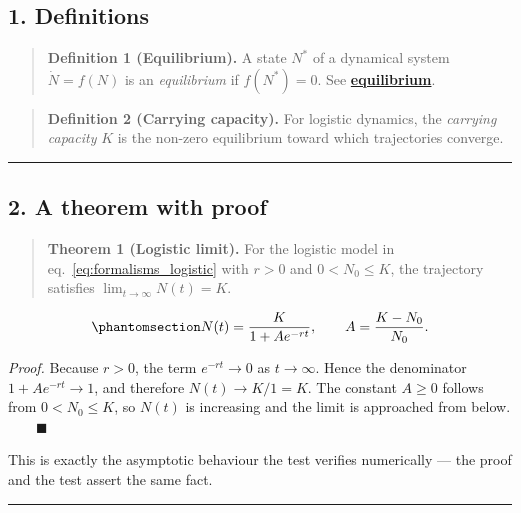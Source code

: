 \documentclass[
]{article}
\theoremstyle{plain}
\theoremstyle{definition}
\begin{document}
\subsection{1. Definitions}\label{definitions}

\begin{quote}
\textbf{Definition 1 (Equilibrium).} A state \(N^{*}\) of a dynamical
system \(\dot N = f(N)\) is an \emph{equilibrium} if \(f(N^{*}) = 0\).
See \hyperref[gl:equilibrium]{\textbf{equilibrium}}.
\end{quote}

\begin{quote}
\textbf{Definition 2 (Carrying capacity).} For logistic dynamics, the
\emph{carrying capacity} \(K\) is the non-zero equilibrium toward which
trajectories converge.
\end{quote}

\begin{center}\rule{0.5\linewidth}{0.5pt}\end{center}

\subsection{2. A theorem with proof}\label{a-theorem-with-proof}

\begin{quote}
\textbf{Theorem 1 (Logistic limit).} For the logistic model in
eq.~\ref{eq:formalisms_logistic} with \(r > 0\) and \(0 < N_0 \le K\),
the trajectory satisfies \(\lim_{t \to \infty} N(t) = K\).
\end{quote}

\begin{equation}\protect\phantomsection\label{eq:formalisms_logistic}{ N(t) = \frac{K}{1 + A e^{-rt}}, \qquad A = \frac{K - N_0}{N_0} . }\end{equation}

\emph{Proof.} Because \(r > 0\), the term \(e^{-rt} \to 0\) as
\(t \to \infty\). Hence the denominator \(1 + A e^{-rt} \to 1\), and
therefore \(N(t) \to K/1 = K\). The constant \(A \ge 0\) follows from
\(0 < N_0 \le K\), so \(N(t)\) is increasing and the limit is approached
from below. \(\qquad\blacksquare\)

This is exactly the asymptotic behaviour the test
verifies numerically --- the proof and the test assert the same fact.

\begin{center}\rule{0.5\linewidth}{0.5pt}\end{center}
\end{document}

